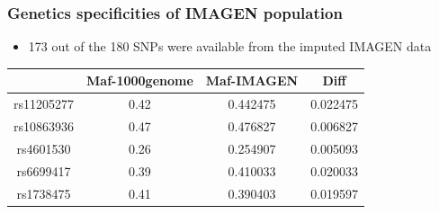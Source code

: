 \documentclass[utf8]{beamer}
\begin{document}
\begin{frame}
\frametitle{Genetics specificities of IMAGEN population }
\begin{itemize}
\item 173 out of the 180 SNPs were available from the imputed IMAGEN data
\end{itemize}
\tiny
\begin{tabular}{|c|c|c|c|}
\hline     &  Maf-1000genome   &    Maf-IMAGEN   &   Diff \\
\hline \hline  rs11205277 & 0.42&  0.442475 & 0.022475\\
\hline  rs10863936 & 0.47 & 0.476827 & 0.006827\\
\hline  rs4601530  & 0.26 & 0.254907 & 0.005093\\
\hline  rs6699417  & 0.39 & 0.410033 &  0.020033\\
\hline  rs1738475 &  0.41 & 0.390403 & 0.019597\\
\hline
\end{tabular} 
\end{frame}
\end{document}
